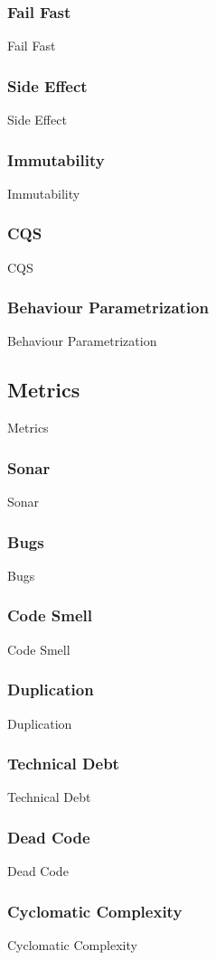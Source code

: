 \subsubsection{Fail Fast}
Fail Fast

\subsubsection{Side Effect}
Side Effect

\subsubsection{Immutability}
Immutability

\subsubsection{CQS}
CQS

\subsubsection{Behaviour Parametrization}
Behaviour Parametrization

\subsection{Metrics}\label{subsec:metrics}
Metrics

\subsubsection{Sonar}
Sonar

\subsubsection{Bugs}
Bugs

\subsubsection{Code Smell}
Code Smell

\subsubsection{Duplication}
Duplication

\subsubsection{Technical Debt}
Technical Debt

\subsubsection{Dead Code}
Dead Code

\subsubsection{Cyclomatic Complexity}
Cyclomatic Complexity
